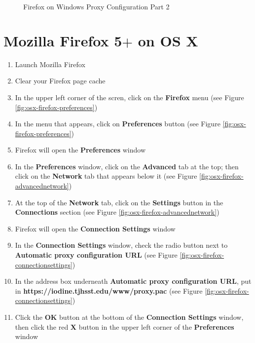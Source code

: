 \documentclass{article}
\newcommand{\proxypacurl}{https://iodine.tjhsst.edu/www/proxy.pac}
\begin{document}
\begin{flushleft}
\begin{figure}[H]
\caption{Firefox on Windows Proxy Configuration Part 2}
\end{figure}
\section{Mozilla Firefox 5$+$ on OS X}
\begin{enumerate}
\item Launch Mozilla Firefox
\item Clear your Firefox page cache
\item In the upper left corner of the scren, click on the \textbf{Firefox} menu (see Figure \ref{fig:osx-firefox-preferences})
\item In the menu that appears, click on \textbf{Preferences} button (see Figure \ref{fig:osx-firefox-preferences})
\item Firefox will open the \textbf{Preferences} window
\item In the \textbf{Preferences} window, click on the \textbf{Advanced} tab at the top; then click on the \textbf{Network} tab that appears below it (see Figure \ref{fig:osx-firefox-advancednetwork})
\item At the top of the \textbf{Network} tab, click on the \textbf{Settings} button in the \textbf{Connections} section (see Figure \ref{fig:osx-firefox-advancednetwork})
\item Firefox will open the \textbf{Connection Settings} window
\item In the \textbf{Connection Settings} window, check the radio button next to \textbf{Automatic proxy configuration URL} (see Figure \ref{fig:osx-firefox-connectionsettings})
\item In the address box underneath \textbf{Automatic proxy configuration URL}, put in \linebreak\textbf{\proxypacurl} (see Figure \ref{fig:osx-firefox-connectionsettings})
\item Click the \textbf{OK} button at the bottom of the \textbf{Connection Settings} window, then click the red \textbf{X} button in the upper left corner of the \textbf{Preferences} window

\end{enumerate}
\end{flushleft}
\end{document}
